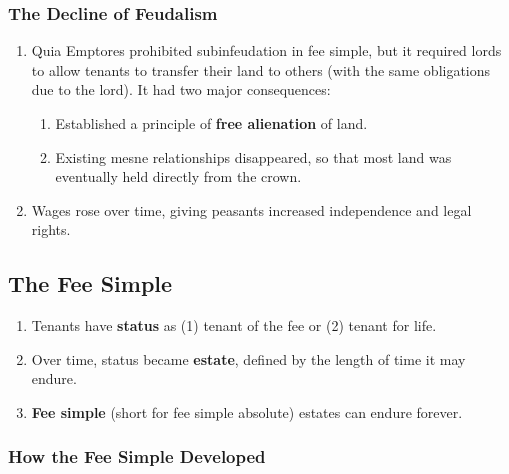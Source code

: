 \subsubsection{The Decline of Feudalism}

\begin{enumerate}
    \item Quia Emptores prohibited subinfeudation in fee simple, but it 
    required lords to allow tenants to transfer their land to others (with the 
    same obligations due to the lord). It had two major consequences:
    \begin{enumerate}
        \item Established a principle of \textbf{free alienation} of land.
        \item Existing mesne relationships disappeared, so that most land was 
        eventually held directly from the crown.
    \end{enumerate}
    \item Wages rose over time, giving peasants increased independence and 
    legal rights.
\end{enumerate}

\subsection{The Fee Simple}

\begin{enumerate}
    \item Tenants have \textbf{status} as (1) tenant of the fee or (2) tenant 
    for life.
    \item Over time, status became \textbf{estate}, defined by the length of 
    time it may endure.
    \item \textbf{Fee simple} (short for fee simple absolute) estates can 
    endure forever. 
\end{enumerate}

\subsubsection{How the Fee Simple Developed}

